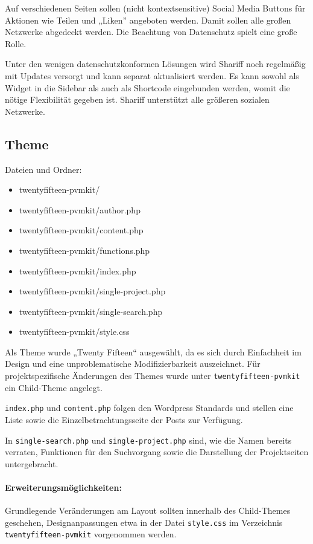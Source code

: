 \documentclass[a4paper,11pt]{article}
\begin{document}
Auf verschiedenen Seiten sollen (nicht kontextsensitive) Social Media Buttons
für Aktionen wie Teilen und „Liken” angeboten werden. Damit sollen alle großen
Netzwerke abgedeckt werden.  Die Beachtung von Datenschutz spielt eine große
Rolle.
 
Unter den wenigen datenschutzkonformen Lösungen wird Shariff noch regelmäßig
mit Updates versorgt und kann separat aktualisiert werden. Es kann sowohl als
Widget in die Sidebar als auch als Shortcode eingebunden werden, womit die
nötige Flexibilität gegeben ist. Shariff unterstützt alle größeren sozialen
Netzwerke.

\subsection{Theme} 
 
Dateien und Ordner:  
\begin{itemize}\itemsep0pt\tt
\item twentyfifteen-pvmkit/
\item twentyfifteen-pvmkit/author.php
\item twentyfifteen-pvmkit/content.php
\item twentyfifteen-pvmkit/functions.php
\item twentyfifteen-pvmkit/index.php
\item twentyfifteen-pvmkit/single-project.php
\item twentyfifteen-pvmkit/single-search.php
\item twentyfifteen-pvmkit/style.css
\end{itemize}
 
Als Theme wurde „Twenty Fifteen“ ausgewählt, da es sich durch Einfachheit im
Design und eine unproblematische Modifizierbarkeit auszeichnet. Für
projektspezifische Änderungen des Themes wurde unter
\texttt{twentyfifteen-pvmkit} ein Child-Theme angelegt.
 
\texttt{index.php} und \texttt{content.php} folgen den Wordpress Standards und
stellen eine Liste sowie die Einzelbetrachtungsseite der Posts zur Verfügung.
 
In \texttt{single-search.php} und \texttt{single-project.php} sind, wie die
Namen bereits verraten, Funktionen für den Suchvorgang sowie die Darstellung
der Projektseiten untergebracht.
 
\paragraph{Erweiterungsmöglichkeiten:}
Grundlegende Veränderungen am Layout sollten innerhalb des Child-Themes
geschehen, Designanpassungen etwa in der Datei \texttt{style.css} im
Verzeichnis \texttt{twentyfifteen-pvmkit} vorgenommen werden.
 
\end{document}
